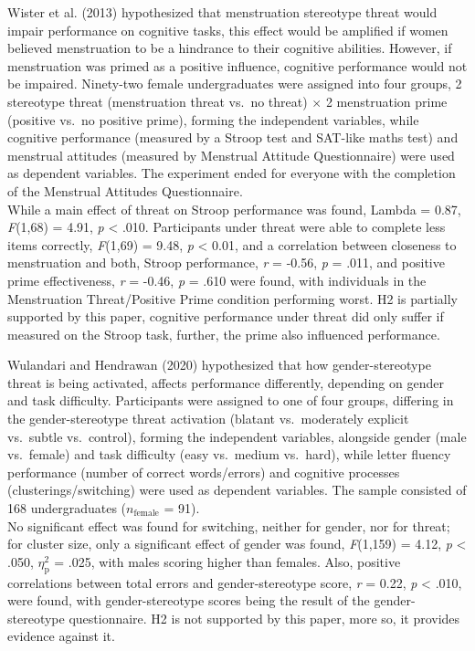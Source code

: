 \documentclass[
  stu, a4paper,floatsintext]{apa7}
\begin{document}
Wister et al. (2013) hypothesized that menstruation stereotype threat would impair performance on cognitive tasks, this effect would be amplified if women believed menstruation to be a hindrance to their cognitive abilities.
However, if menstruation was primed as a positive influence, cognitive performance would not be impaired.
Ninety-two female undergraduates were assigned into four groups, 2 stereotype threat (menstruation threat vs.~no threat) \(\times\) 2 menstruation prime (positive vs.~no positive prime), forming the independent variables, while cognitive performance (measured by a Stroop test and SAT-like maths test) and menstrual attitudes (measured by Menstrual Attitude Questionnaire) were used as dependent variables.
The experiment ended for everyone with the completion of the Menstrual Attitudes Questionnaire.\\
While a main effect of threat on Stroop performance was found, Lambda = 0.87, \emph{F}(1,68) = 4.91, \emph{p} \textless{} .010.
Participants under threat were able to complete less items correctly, \emph{F}(1,69) = 9.48, \emph{p} \textless{} 0.01, and a correlation between closeness to menstruation and both, Stroop performance, \emph{r} = -0.56, \emph{p} = .011, and positive prime effectiveness, \emph{r} = -0.46, \emph{p} = .610 were found, with individuals in the Menstruation Threat/Positive Prime condition performing worst.
H2 is partially supported by this paper, cognitive performance under threat did only suffer if measured on the Stroop task, further, the prime also influenced performance.

Wulandari and Hendrawan (2020) hypothesized that how gender-stereotype threat is being activated, affects performance differently, depending on gender and task difficulty.
Participants were assigned to one of four groups, differing in the gender-stereotype threat activation (blatant vs.~moderately explicit vs.~subtle vs.~control), forming the independent variables, alongside gender (male vs.~female) and task difficulty (easy vs.~medium vs.~hard), while letter fluency performance (number of correct words/errors) and cognitive processes (clusterings/switching) were used as dependent variables.
The sample consisted of 168 undergraduates (\(n_{\text{female}}\) = 91).\\
No significant effect was found for switching, neither for gender, nor for threat; for cluster size, only a significant effect of gender was found, \emph{F}(1,159) = 4.12, \emph{p} \textless{} .050, \(\eta^{2}_{\text{p}}\) = .025, with males scoring higher than females.
Also, positive correlations between total errors and gender-stereotype score, \emph{r} = 0.22, \emph{p} \textless{} .010, were found, with gender-stereotype scores being the result of the gender-stereotype questionnaire.
H2 is not supported by this paper, more so, it provides evidence against it.
\end{document}
